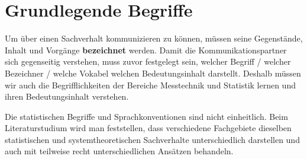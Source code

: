 
\section{Grundlegende Begriffe}
Um über einen Sachverhalt kommunizieren zu können, müssen seine Gegenstände, Inhalt und Vorgänge
\textbf{bezeichnet} werden. Damit die Kommunikationspartner sich gegenseitig verstehen, muss zuvor
festgelegt sein, welcher Begriff / welcher Bezeichner / welche Vokabel welchen Bedeutungsinhalt darstellt.
Deshalb müssen wir auch die Begrifflichkeiten der Bereiche Messtechnik und Statistik lernen und ihren
Bedeutungsinhalt verstehen.

Die statistischen Begriffe und Sprachkonventionen sind nicht einheitlich.
Beim Literaturstudium wird man feststellen, dass verschiedene Fachgebiete dieselben statistischen und
systemtheoretischen Sachverhalte unterschiedlich darstellen und auch mit teilweise recht unterschiedlichen
Ansätzen behandeln.

